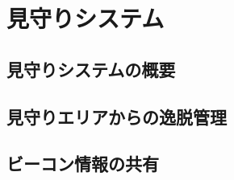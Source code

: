 \chapter{見守りシステム}
\label{chap:poordirection}


\section{見守りシステムの概要}

\section{見守りエリアからの逸脱管理}

\section{ビーコン情報の共有}


